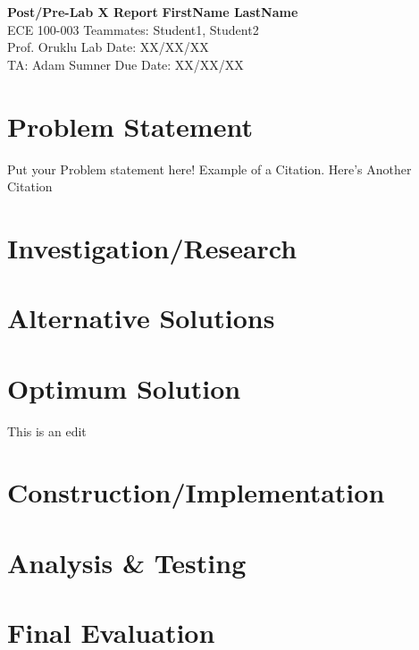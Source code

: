 \documentclass[a4paper, 11pt]{article}
\begin{document}
\noindent
\large\textbf{Post/Pre-Lab X Report} \hfill \textbf{FirstName LastName} \\
\normalsize ECE 100-003 \hfill Teammates: Student1, Student2 \\
Prof. Oruklu \hfill Lab Date: XX/XX/XX \\
TA: Adam Sumner \hfill Due Date: XX/XX/XX

\section*{Problem Statement}
Put your Problem statement here! Example of a Citation\cite[p.219]{Robotics}. Here's Another Citation\cite{Flueck}

\section*{Investigation/Research}
\lipsum[2]

\section*{Alternative Solutions}
\lipsum[3]

\section*{Optimum Solution}
\lipsum[4]

This is an edit

\section*{Construction/Implementation}
\lipsum[5]

\section*{Analysis \& Testing}
\lipsum[6]

\section*{Final Evaluation}
\lipsum[7]
\end{document}
